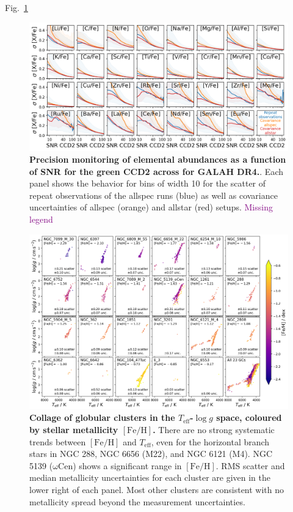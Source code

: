 \documentclass[
  journal=pasa,
  manuscript=research-paper, %
  year=2024,
  volume=37
]{cup-journal}
\newcommand{\SB}[1]{{\textcolor{purple}{#1}}}
\newcommand{\Teff}{$T_\mathrm{eff}$\xspace}
\newcommand{\logg}{$\log g$\xspace}
\newcommand{\feh}{$\mathrm{[Fe/H]}$\xspace}
\begin{document}
Fig.~\ref{fig:galah_dr4_precision_abundances}

\begin{figure}[ht]
 \centering
 \includegraphics[width=\textwidth]{figures/galah_dr4_precision_abundances.png}
 \caption{\textbf{Precision monitoring of elemental abundances as a function of SNR for the green CCD2 across for GALAH DR4.}. Each panel shows the behavior for bins of width 10 for the scatter of repeat observations of the allspec runs (blue) as well as covariance uncertainties of allspec (orange) and allstar (red) setups. \SB{Missing legend}}
 \label{fig:galah_dr4_precision_abundances}
\end{figure}

\begin{figure}
\includegraphics[width=\textwidth]{figures/galah_dr4_gcs_teff_logg.png}
\caption{
\textbf{Collage of globular clusters in the \Teff-\logg space, coloured by stellar metallicity \feh.} There are no strong systematic trends between \feh and \Teff, even for the horizontal branch stars in NGC 288, NGC 6656 (M22), and NGC 6121 (M4). NGC 5139 ($\mathrm{\omega}$Cen) shows a significant range in \feh. RMS scatter and median metallicity uncertainties for each cluster are given in the lower right of each panel. Most other clusters are consistent with no metallicity spread beyond the measurement uncertainties. 
}
\label{fig:galah_dr4_gcs_teff_logg}
\end{figure}
\end{document}
